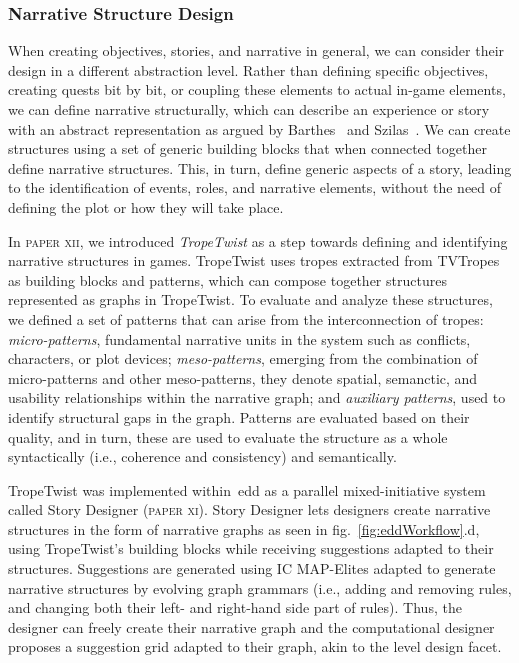 
\subsubsection{Narrative Structure Design}

When creating objectives, stories, and narrative in general, we can consider their design in a different abstraction level. Rather than defining specific objectives, creating quests bit by bit, or coupling these elements to actual in-game elements, we can define narrative structurally, which can describe an experience or story with an abstract representation as argued by Barthes~\cite{barthes_introduction_1966} and Szilas~\cite{szilas_idtension_2003}. We can create structures using a set of generic building blocks that when connected together define narrative structures. This, in turn, define generic aspects of a story, leading to the identification of events, roles, and narrative elements, without the need of defining the plot or how they will take place.

In \textsc{paper xii}, we introduced \emph{TropeTwist} as a step towards defining and identifying narrative structures in games. TropeTwist uses tropes extracted from TVTropes~\cite{richmond_tv_2004} as building blocks and patterns, which can compose together structures represented as graphs in TropeTwist. To evaluate and analyze these structures, we defined a set of patterns that can arise from the interconnection of tropes: \emph{micro-patterns}, fundamental narrative units in the system such as conflicts, characters, or plot devices; \emph{meso-patterns}, emerging from the combination of micro-patterns and other meso-patterns, they denote spatial, semanctic, and usability relationships within the narrative graph; and \emph{auxiliary patterns}, used to identify structural gaps in the graph. Patterns are evaluated based on their quality, and in turn, these are used to evaluate the structure as a whole syntactically (i.e., coherence and consistency) and semantically.

TropeTwist was implemented within~\acrshort{edd} as a parallel mixed-initiative system called Story Designer (\textsc{paper xi}). Story Designer lets designers create narrative structures in the form of narrative graphs as seen in fig.~\ref{fig:eddWorkflow}.d, using TropeTwist's building blocks while receiving suggestions adapted to their structures. Suggestions are generated using IC MAP-Elites adapted to generate narrative structures by evolving graph grammars (i.e., adding and removing rules, and changing both their left- and right-hand side part of rules). Thus, the designer can freely create their narrative graph and the computational designer proposes a suggestion grid adapted to their graph, akin to the level design facet. 


